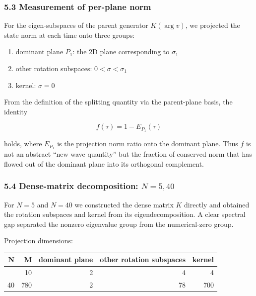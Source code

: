 \documentclass[
  a4paper,
]{article}
\newcounter{none} %
\providecommand{\tightlist}{%
  \setlength{\itemsep}{0pt}\setlength{\parskip}{0pt}}
\begin{document}
\subsubsection{5.3 Measurement of per-plane
norm}\label{measurement-of-per-plane-norm}

For the eigen-subspaces of the parent generator \(K(\arg v)\), we
projected the state norm at each time onto three groups:

\begin{enumerate}
\def\labelenumi{\arabic{enumi}.}
\tightlist
\item
  dominant plane \(P_1\): the 2D plane corresponding to \(\sigma_1\)
\item
  other rotation subspaces: \(0<\sigma<\sigma_1\)
\item
  kernel: \(\sigma=0\)
\end{enumerate}

From the definition of the splitting quantity via the parent-plane
basis, the identity

\[
\boxed{f(\tau)=1-E_{P_1}(\tau)}
\]

holds, where \(E_{P_1}\) is the projection norm ratio onto the dominant
plane. Thus \(f\) is not an abstract ``new wave quantity'' but the
fraction of conserved norm that has flowed out of the dominant plane
into its orthogonal complement.

\subsubsection{\texorpdfstring{5.4 Dense-matrix decomposition:
\(N=5,40\)}{5.4 Dense-matrix decomposition: N=5,40}}\label{dense-matrix-decomposition-n540}

For \(N=5\) and \(N=40\) we constructed the dense matrix \(K\) directly
and obtained the rotation subspaces and kernel from its
eigendecomposition. A clear spectral gap separated the nonzero
eigenvalue group from the numerical-zero group.

Projection dimensions:

{\def\LTcaptype{none} %
\begin{longtable}[]{@{}rrrrr@{}}
\toprule\noalign{}
N & M & dominant plane & other rotation subspaces & kernel \\
\midrule\noalign{}
\endhead
\bottomrule\noalign{}
\endlastfoot
5 & 10 & 2 & 4 & 4 \\
40 & 780 & 2 & 78 & 700 \\
\end{longtable}
}
\end{document}
